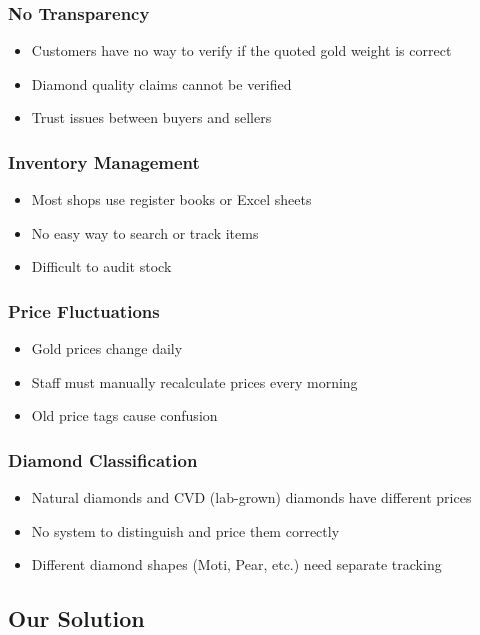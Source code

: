 \documentclass[12pt,a4paper]{article}
\begin{document}
\subsubsection{No Transparency}
\begin{itemize}
    \item Customers have no way to verify if the quoted gold weight is correct
    \item Diamond quality claims cannot be verified
    \item Trust issues between buyers and sellers
\end{itemize}

\subsubsection{Inventory Management}
\begin{itemize}
    \item Most shops use register books or Excel sheets
    \item No easy way to search or track items
    \item Difficult to audit stock
\end{itemize}

\subsubsection{Price Fluctuations}
\begin{itemize}
    \item Gold prices change daily
    \item Staff must manually recalculate prices every morning
    \item Old price tags cause confusion
\end{itemize}

\subsubsection{Diamond Classification}
\begin{itemize}
    \item Natural diamonds and CVD (lab-grown) diamonds have different prices
    \item No system to distinguish and price them correctly
    \item Different diamond shapes (Moti, Pear, etc.) need separate tracking
\end{itemize}

\subsection{Our Solution}
\end{document}
